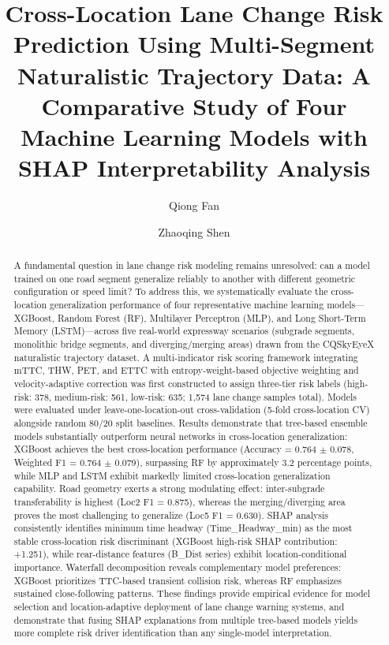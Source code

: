 \documentclass[preprint,review,12pt,a4paper]{elsarticle}
\begin{document}
\begin{frontmatter}

\title{Cross-Location Lane Change Risk Prediction Using Multi-Segment Naturalistic Trajectory Data: A Comparative Study of Four Machine Learning Models with SHAP Interpretability Analysis}

\author{Qiong Fan}
\author{Zhaoqing Shen}

\begin{abstract}
A fundamental question in lane change risk modeling remains unresolved: can a model trained on one road segment generalize reliably to another with different geometric configuration or speed limit? To address this, we systematically evaluate the cross-location generalization performance of four representative machine learning models---XGBoost, Random Forest (RF), Multilayer Perceptron (MLP), and Long Short-Term Memory (LSTM)---across five real-world expressway scenarios (subgrade segments, monolithic bridge segments, and diverging/merging areas) drawn from the CQSkyEyeX naturalistic trajectory dataset. A multi-indicator risk scoring framework integrating mTTC, THW, PET, and ETTC with entropy-weight-based objective weighting and velocity-adaptive correction was first constructed to assign three-tier risk labels (high-risk: 378, medium-risk: 561, low-risk: 635; 1,574 lane change samples total). Models were evaluated under leave-one-location-out cross-validation (5-fold cross-location CV) alongside random 80/20 split baselines. Results demonstrate that tree-based ensemble models substantially outperform neural networks in cross-location generalization: XGBoost achieves the best cross-location performance (Accuracy = 0.764 $\pm$ 0.078, Weighted F1 = 0.764 $\pm$ 0.079), surpassing RF by approximately 3.2 percentage points, while MLP and LSTM exhibit markedly limited cross-location generalization capability. Road geometry exerts a strong modulating effect: inter-subgrade transferability is highest (Loc2 F1 = 0.875), whereas the merging/diverging area proves the most challenging to generalize (Loc5 F1 = 0.630). SHAP analysis consistently identifies minimum time headway (Time\_Headway\_min) as the most stable cross-location risk discriminant (XGBoost high-risk SHAP contribution: +1.251), while rear-distance features (B\_Dist series) exhibit location-conditional importance. Waterfall decomposition reveals complementary model preferences: XGBoost prioritizes TTC-based transient collision risk, whereas RF emphasizes sustained close-following patterns. These findings provide empirical evidence for model selection and location-adaptive deployment of lane change warning systems, and demonstrate that fusing SHAP explanations from multiple tree-based models yields more complete risk driver identification than any single-model interpretation.
\end{abstract}


\end{frontmatter}
\end{document}
